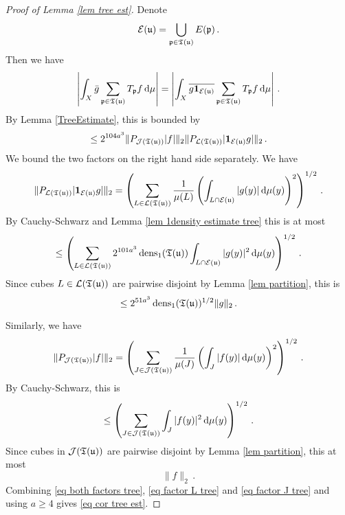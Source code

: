 {\begin{proof}[Proof of Lemma \ref{lem tree est}]
    Denote
    $$
        \mathcal{E}(\mathfrak u) = \bigcup_{\mathfrak p \in \mathfrak T(\mathfrak u)} E(\mathfrak p)\,.
    $$
    Then we have
    $$
        \left| \int_X \bar g \sum_{\mathfrak p \in \mathfrak T(\mathfrak u)} T_{\mathfrak p} f \, \mathrm{d}\mu \right|  = \left| \int_X \overline{ g\mathbf{1}_{\mathcal{E}(\mathfrak u)}}  \sum_{\mathfrak p \in \mathfrak T(\mathfrak u)} T_{\mathfrak p} f \, \mathrm{d}\mu \right|\,.
    $$
    By Lemma \ref{TreeEstimate}, this is bounded by
    \begin{equation}
        \label{eq both factors tree}
        \le 2^{104a^3}\|P_{\mathcal{J}(\mathfrak T(\mathfrak u))}|f|\|_2 \|P_{\mathcal{L}(\mathfrak T(\mathfrak u))} |\mathbf{1}_{\mathcal{E}(\mathfrak u)}g|\|_2\,.
    \end{equation}
    We bound the two factors on the right hand side separately.
    We have
    $$
        \|P_{\mathcal{L}(\mathfrak T(\mathfrak u))} |\mathbf{1}_{\mathcal{E}(\mathfrak u)}g|\|_2 = \left( \sum_{L \in \mathcal{L}(\mathfrak T(\mathfrak u))} \frac{1}{\mu(L)} \left(\int_{L \cap \mathcal{E}(\mathfrak u)} |g(y)| \, \mathrm{d}\mu(y)\right)^2 \right)^{1/2}\,.
    $$
    By Cauchy-Schwarz and Lemma \ref{lem 1density estimate tree} this is at most
    $$
        \le \left( \sum_{L \in \mathcal{L}(\mathfrak T(\mathfrak u))} 2^{101a^3} \operatorname{\operatorname{dens}}_1(\mathfrak T(\mathfrak u)) \int_{L \cap \mathcal{E}(\mathfrak u)} |g(y)|^2 \, \mathrm{d}\mu(y) \right)^{1/2}\,.
    $$
    Since cubes $L \in \mathcal{L}(\mathfrak T(\mathfrak u))$ are pairwise disjoint by Lemma \ref{lem partition}, this is
    \begin{equation}
        \label{eq factor L tree}
         \le 2^{51 a^3} \operatorname{\operatorname{dens}}_1(\mathfrak T(\mathfrak u))^{1/2} \|g\|_2\,.
    \end{equation}

    Similarly, we have
    \begin{equation}
        \label{eq cor tree proof}
        \|P_{\mathcal{J}(\mathfrak T(\mathfrak u))}|f|\|_2  = \left( \sum_{J \in \mathcal{J}(\mathfrak T(\mathfrak u))} \frac{1}{\mu(J)} \left(\int_J |f(y)| \, \mathrm{d}\mu(y)\right)^2 \right)^{1/2}\,.
    \end{equation}
    By Cauchy-Schwarz, this is
    $$
        \le \left( \sum_{J \in \mathcal{J}(\mathfrak T(\mathfrak u))} \int_J |f(y)|^2 \, \mathrm{d}\mu(y) \right)^{1/2}\,.
    $$
    Since cubes in $\mathcal{J}(\mathfrak T(\mathfrak u))$ are pairwise disjoint by Lemma \ref{lem partition}, this at most
    \begin{equation}
        \label{eq factor J tree}
        \|f\|_2\,.
    \end{equation}
    Combining \eqref{eq both factors tree}, \eqref{eq factor L tree} and \eqref{eq factor J tree} and using $a \ge 4$ gives \eqref{eq cor tree est}.


\end{proof}}
